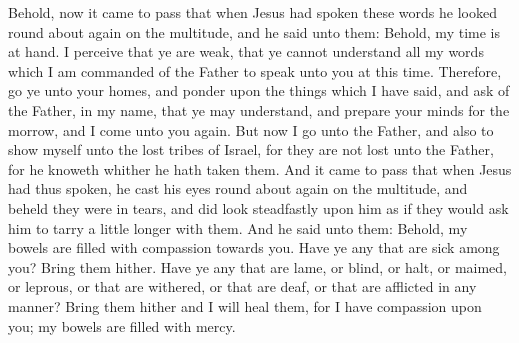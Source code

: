 \bchapter
\bverse \iffalse Behold, now it came to pass that when Jesus had spoken these words he looked round about again on the multitude, and he said unto them: Behold, my time is at hand. \fi
Behold, now it came to pass that when Jesus had spoken these words he looked round about again on the multitude, and he said unto them: Behold, my time is at hand.
\bverse \iffalse I perceive that ye are weak, that ye cannot understand all my words which I am commanded of the Father to speak unto you at this time. \fi
I perceive that ye are weak, that ye cannot understand all my words which I am commanded of the Father to speak unto you at this time.
\bverse \iffalse Therefore, go ye unto your homes, and ponder upon the things which I have said, and ask of the Father, in my name, that ye may understand, and prepare your minds for the morrow, and I come unto you again. \fi
Therefore, go ye unto your homes, and ponder upon the things which I have said, and ask of the Father, in my name, that ye may understand, and prepare your minds for the morrow, and I come unto you again.
\bverse \iffalse But now I go unto the Father, and also to show myself unto the lost tribes of Israel, for they are not lost unto the Father, for he knoweth whither he hath taken them. \fi
But now I go unto the Father, and also to show myself unto the lost tribes of Israel, for they are not lost unto the Father, for he knoweth whither he hath taken them.
\bverse \iffalse And it came to pass that when Jesus had thus spoken, he cast his eyes round about again on the multitude, and beheld they were in tears, and did look steadfastly upon him as if they would ask him to tarry a little longer with them. \fi
And it came to pass that when Jesus had thus spoken, he cast his eyes round about again on the multitude, and beheld they were in tears, and did look steadfastly upon him as if they would ask him to tarry a little longer with them.
\bverse \iffalse And he said unto them: Behold, my bowels are filled with compassion towards you. \fi
And he said unto them: Behold, my bowels are filled with compassion towards you.
\bverse \iffalse Have ye any that are sick among you? Bring them hither. Have ye any that are lame, or blind, or halt, or maimed, or leprous, or that are withered, or that are deaf, or that are afflicted in any manner? Bring them hither and I will heal them, for I have compassion upon you; my bowels are filled with mercy. \fi
Have ye any that are sick among you? Bring them hither. Have ye any that are lame, or blind, or halt, or maimed, or leprous, or that are withered, or that are deaf, or that are afflicted in any manner? Bring them hither and I will heal them, for I have compassion upon you; my bowels are filled with mercy.

